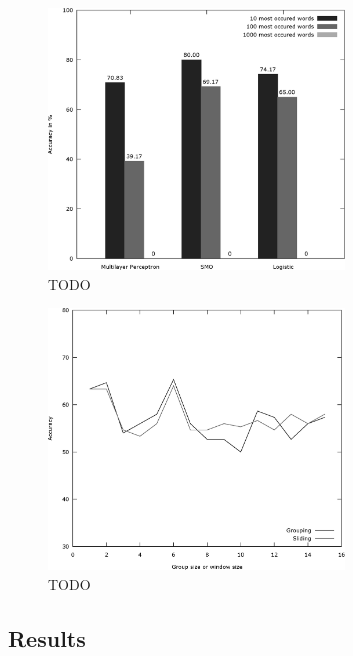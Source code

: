 \begin{figure}
	\label{fig:product_feature_selection_without_none}
	\begin{center}
		\includegraphics[width=0.7\textwidth]{figures/product_feature_selection_without_none.eps}
	\end{center}
	\caption{TODO}
\end{figure}

\begin{figure}
	\label{fig:sampling_optimization}
	\begin{center}
		\includegraphics[width=0.7\textwidth]{figures/sampling_optimization.eps}
	\end{center}
	\caption{TODO}
\end{figure}


\subsection{Results}
\label{sub:results}


